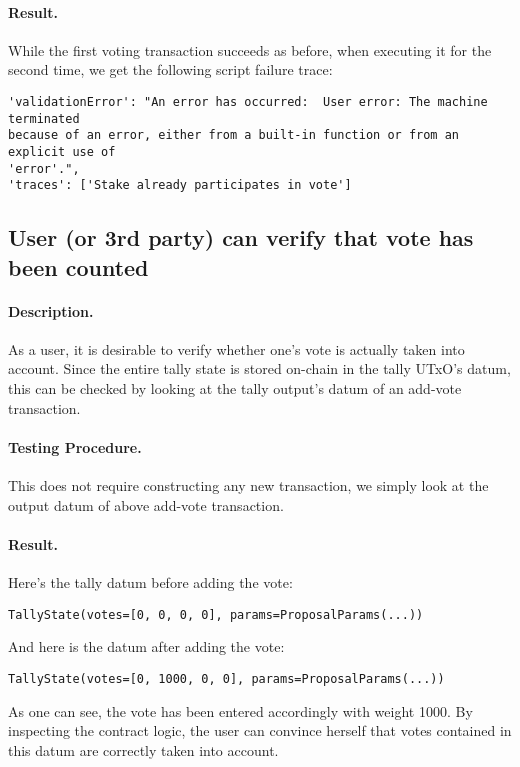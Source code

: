 \documentclass[11pt]{article}
\begin{document}
\paragraph{Result.} While the first voting transaction succeeds as before, when executing it for the second time, we get the following script failure trace:
\begin{verbatim}
'validationError': "An error has occurred:  User error: The machine terminated
because of an error, either from a built-in function or from an explicit use of
'error'.",
'traces': ['Stake already participates in vote']
\end{verbatim}




\subsection{User (or 3rd party) can verify that vote has been counted}
\paragraph{Description.} As a user, it is desirable to verify whether one's vote is actually taken into account. Since the entire tally state is stored on-chain in the tally UTxO's datum, this can be checked by looking at the tally output's datum of an add-vote transaction.

\paragraph{Testing Procedure.} This does not require constructing any new transaction, we simply look at the output datum of above add-vote transaction.

\paragraph{Result.} Here's the tally datum before adding the vote:
\begin{verbatim}
TallyState(votes=[0, 0, 0, 0], params=ProposalParams(...))
\end{verbatim}

And here is the datum after adding the vote:
\begin{verbatim}
TallyState(votes=[0, 1000, 0, 0], params=ProposalParams(...))
\end{verbatim}

As one can see, the vote has been entered accordingly with weight 1000. By inspecting the contract logic, the user can convince herself that votes contained in this datum are correctly taken into account.
\end{document}
